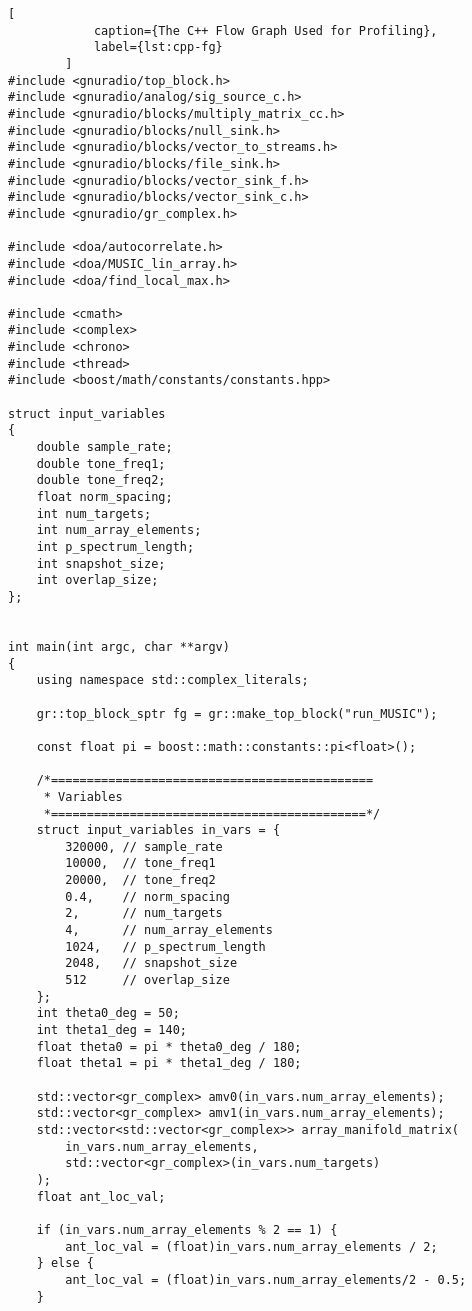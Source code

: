 		\begin{lstlisting}[
		    caption={The C++ Flow Graph Used for Profiling},
		    label={lst:cpp-fg}
		]
#include <gnuradio/top_block.h>
#include <gnuradio/analog/sig_source_c.h>
#include <gnuradio/blocks/multiply_matrix_cc.h>
#include <gnuradio/blocks/null_sink.h>
#include <gnuradio/blocks/vector_to_streams.h>
#include <gnuradio/blocks/file_sink.h>
#include <gnuradio/blocks/vector_sink_f.h>
#include <gnuradio/blocks/vector_sink_c.h>
#include <gnuradio/gr_complex.h>

#include <doa/autocorrelate.h>
#include <doa/MUSIC_lin_array.h>
#include <doa/find_local_max.h>

#include <cmath>
#include <complex>
#include <chrono>
#include <thread>
#include <boost/math/constants/constants.hpp>

struct input_variables
{
    double sample_rate;
    double tone_freq1;
    double tone_freq2;
    float norm_spacing;
    int num_targets;
    int num_array_elements;
    int p_spectrum_length;
    int snapshot_size;
    int overlap_size;
};


int main(int argc, char **argv)
{
    using namespace std::complex_literals;

    gr::top_block_sptr fg = gr::make_top_block("run_MUSIC");

    const float pi = boost::math::constants::pi<float>();

    /*=============================================
     * Variables
     *============================================*/
    struct input_variables in_vars = {
        320000, // sample_rate
        10000,  // tone_freq1
        20000,  // tone_freq2
        0.4,    // norm_spacing
        2,      // num_targets
        4,      // num_array_elements
        1024,   // p_spectrum_length
        2048,   // snapshot_size
        512     // overlap_size
    };
    int theta0_deg = 50;
    int theta1_deg = 140;
    float theta0 = pi * theta0_deg / 180;
    float theta1 = pi * theta1_deg / 180;
    
    std::vector<gr_complex> amv0(in_vars.num_array_elements);
    std::vector<gr_complex> amv1(in_vars.num_array_elements);
    std::vector<std::vector<gr_complex>> array_manifold_matrix(
        in_vars.num_array_elements,
        std::vector<gr_complex>(in_vars.num_targets)
    );
    float ant_loc_val;
    
    if (in_vars.num_array_elements % 2 == 1) {
        ant_loc_val = (float)in_vars.num_array_elements / 2;
    } else {
        ant_loc_val = (float)in_vars.num_array_elements/2 - 0.5;
    }


\end{lstlisting}
